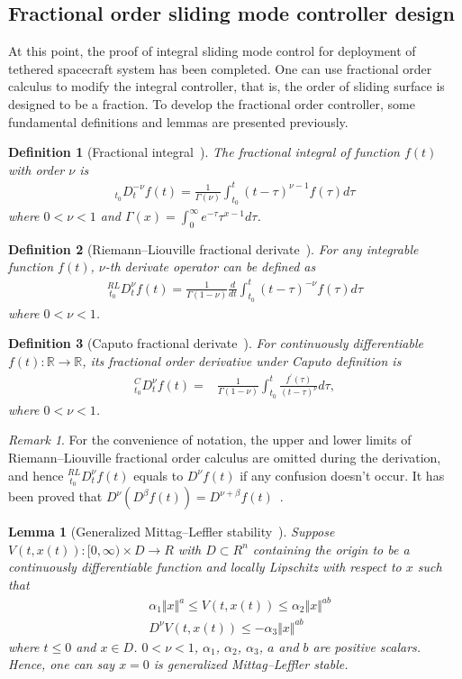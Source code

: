 \documentclass[ShortAfour]{sage}
\theoremstyle{plain}
\newtheorem{mydef}{Definition}
\newtheorem{mylem}{Lemma}
\theoremstyle{remark}
\newtheorem{myrem}{Remark}
\begin{document}
\subsection{Fractional order sliding mode controller design}\label{sec:fractional controller design} 
At this point, the proof of integral sliding mode control for deployment of tethered spacecraft system has been completed. One can use fractional order calculus to modify the integral controller, that is, the order of sliding surface is designed to be a fraction. To develop the fractional order controller, some fundamental definitions and lemmas are presented previously.
\begin{mydef}[Fractional integral~\cite{Podlubny1999}]
  The fractional integral of function $f(t)$ with order $\nu$ is
  \begin{align}
    _{t_0}D_t^{-\nu} f(t)=\frac{1}{\Gamma(\nu)}\int_{t_0}^t(t-\tau)^{\nu-1}f(\tau)d\tau
  \end{align}
  where $0< \nu< 1$ and $\Gamma(x)=\int_0^\infty e^{-\tau}\tau^{x-1}d\tau$.
  \end{mydef}
\begin{mydef}[Riemann--Liouville fractional derivate~\cite{Podlubny1999}]
For any integrable function $f(t)$, $\nu$-th derivate operator can be defined as
\begin{align}
  ^{RL}_{\ t_0}D_t^\nu f(t)=\frac{1}{\Gamma(1-\nu)}\frac{d}{dt}\int_{t_0}^t(t-\tau)^{-\nu}f(\tau)d\tau
\end{align}
where $0< \nu< 1$.
\end{mydef}
\begin{mydef}[Caputo fractional derivate~\cite{Podlubny1999}]
  For continuously differentiable $f(t):\mathbb R\to \mathbb R$, its fractional order derivative under Caputo definition is
  \begin{align} {}^C_{t_0}D^\nu_tf(t)=
      &\frac{1}{\Gamma(1-\nu)}\int^t_{t_0}\frac{f^{'}(\tau)}{(t-\tau)^{\nu}}d\tau, 
    \end{align}
    where $0<\nu<1$.
  \end{mydef}
\begin{myrem}
  For the convenience of notation, the upper and lower limits of Riemann--Liouville fractional order calculus are omitted during the derivation, and hence $^{RL}_{\ t_0}D_t^\nu f(t)$ equals to $D^\nu f(t)$ if any confusion doesn't occur. It has been proved that $D^\nu\left(D^\beta f(t)\right)=D^{\nu+\beta}f(t)$~\cite{Podlubny1999}.
\end{myrem}
\begin{mylem}[Generalized Mittag--Leffler stability~\cite{Li2009,Li2010}]
  Suppose $V(t,x(t)):[0,\infty)\times D\to R$ with $D\subset R^n$ containing the origin to be a continuously differentiable function and locally Lipschitz with respect to $x$ such that
  \begin{align}
    &\alpha_1\Vert x\Vert^a\le V(t,x(t))\le\alpha_2\Vert x\Vert^{ab}\label{eq:ml c1}\\
    &D^\nu V(t,x(t))\le -\alpha_3\Vert x\Vert^{ab}\label{eq:ml c2}
  \end{align}
  where $t\le 0$ and $x\in D$. $0<\nu<1$, $\alpha_1$, $\alpha_2$, $\alpha_3$, $a$ and $b$ are positive scalars. Hence, one can say $x=0$ is generalized Mittag--Leffler stable.
\end{mylem}
\end{document}
